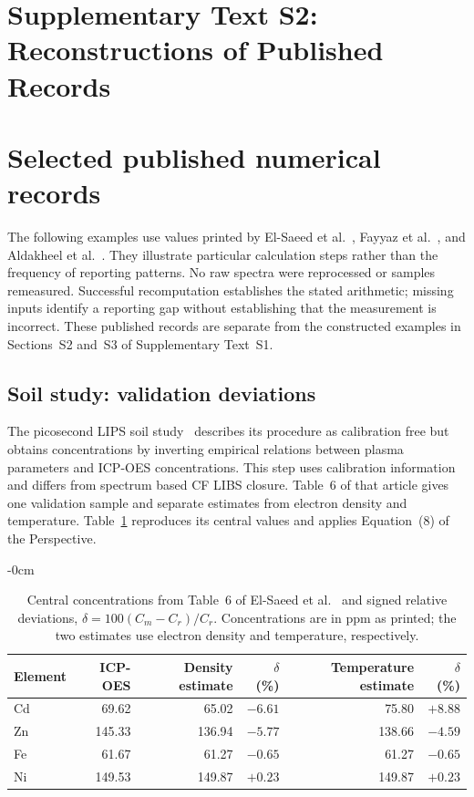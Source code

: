 \documentclass[11pt]{article}
\newlength{\extralength}
\begin{document}
\setcounter{section}{4}
\setcounter{table}{5}
\setcounter{equation}{3}

\section*{Supplementary Text S2: Reconstructions of Published Records}

\section{Selected published numerical records}\label{sec:published-records}
The following examples use values printed by El-Saeed et al.~\cite{ElSaeed2025}, Fayyaz et al.~\cite{Fayyaz2023}, and Aldakheel et al.~\cite{Aldakheel2024}. They illustrate particular calculation steps rather than the frequency of reporting patterns. No raw spectra were reprocessed or samples remeasured. Successful recomputation establishes the stated arithmetic; missing inputs identify a reporting gap without establishing that the measurement is incorrect. These published records are separate from the constructed examples in Sections~S2 and~S3 of Supplementary Text~S1.

\subsection{Soil study: validation deviations}\label{sec:published-soil}
The picosecond LIPS soil study~\cite{ElSaeed2025} describes its procedure as calibration free but obtains concentrations by inverting empirical relations between plasma parameters and ICP-OES concentrations. This step uses calibration information and differs from spectrum based CF LIBS closure. Table~6 of that article gives one validation sample and separate estimates from electron density and temperature. Table~\ref{tab:published-soil} reproduces its central values and applies Equation~(8) of the Perspective.

\begin{table}[htbp]
\begin{adjustwidth}{-\extralength}{0cm}
\caption{Central concentrations from Table~6 of El-Saeed et al.~\cite{ElSaeed2025} and signed relative deviations, $\delta=100(C_m-C_r)/C_r$. Concentrations are in ppm as printed; the two estimates use electron density and temperature, respectively.}\label{tab:published-soil}
\centering\small
\begin{tabular}{@{}lrrrrr@{}}\toprule
Element&ICP-OES&Density estimate&$\delta$ (\%)&Temperature estimate&$\delta$ (\%)\\\midrule
Cd&69.62&65.02&$-6.61$&75.80&$+8.88$\\
Zn&145.33&136.94&$-5.77$&138.66&$-4.59$\\
Fe&61.67&61.27&$-0.65$&61.27&$-0.65$\\
Ni&149.53&149.87&$+0.23$&149.87&$+0.23$\\
\bottomrule
\end{tabular}
\end{adjustwidth}
\end{table}
\end{document}
